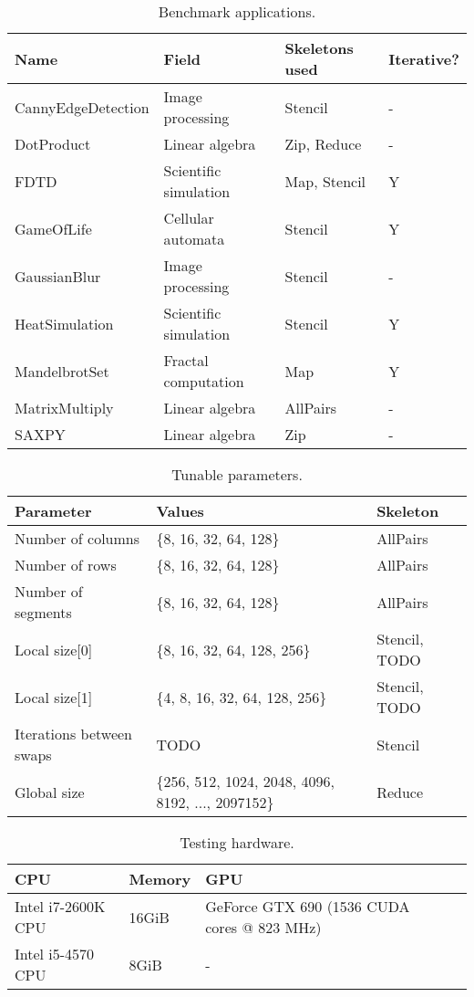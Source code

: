 %

\newpage
\begin{table}[h]
\centering
\begin{tabular}{| l | l | l | l |}
\hline
\textbf{Name} & \textbf{Field} & \textbf{Skeletons used} & \textbf{Iterative?}\\
\hline
CannyEdgeDetection & Image processing & Stencil & -\\
DotProduct & Linear algebra & Zip, Reduce & -\\
FDTD & Scientific simulation & Map, Stencil & Y\\
GameOfLife & Cellular automata & Stencil & Y\\
GaussianBlur & Image processing & Stencil & -\\
HeatSimulation & Scientific simulation & Stencil & Y\\
MandelbrotSet & Fractal computation & Map & Y\\
MatrixMultiply & Linear algebra & AllPairs & -\\
SAXPY & Linear algebra & Zip & -\\
\hline
\end{tabular}
\caption{Benchmark applications.}
\end{table}

\begin{table}[h]
\centering
\begin{tabular}{| l | l | l |}
\hline
\textbf{Parameter} & \textbf{Values} & \textbf{Skeleton}\\
\hline
Number of columns & \{8, 16, 32, 64, 128\} & AllPairs\\
Number of rows & \{8, 16, 32, 64, 128\} & AllPairs\\
Number of segments & \{8, 16, 32, 64, 128\} & AllPairs\\
Local size[0] & \{8, 16, 32, 64, 128, 256\} & Stencil, TODO\\
Local size[1] & \{4, 8, 16, 32, 64, 128, 256\} & Stencil, TODO\\
Iterations between swaps & TODO & Stencil\\
Global size & \{256, 512, 1024, 2048, 4096, 8192, ..., 2097152\} & Reduce\\
\hline
\end{tabular}
\caption{Tunable parameters.}
\end{table}

\begin{table}[h]
\centering
\begin{tabular}{| l | l | l | l |}
\hline
\textbf{CPU} & \textbf{Memory} & \textbf{GPU}\\
\hline
Intel i7-2600K CPU & 16GiB & GeForce GTX 690 (1536 CUDA cores @ 823 MHz)\\
Intel i5-4570 CPU & 8GiB & -\\
\hline
\end{tabular}
\caption{Testing hardware.}
\end{table}

\newpage
